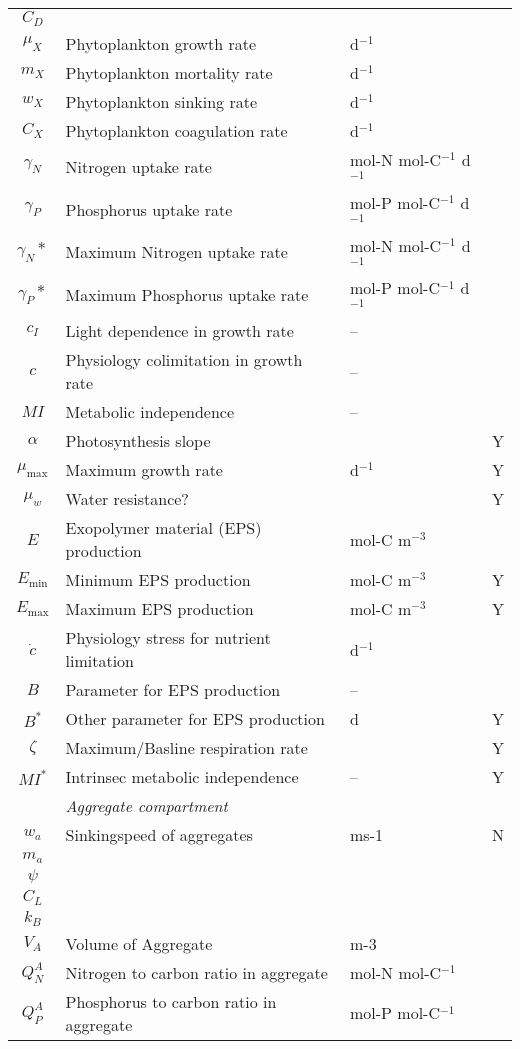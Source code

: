 \documentclass[fleqn]{article}                     %
\begin{document}
\begin{table*}[h]
\begin{tabular}{clll}
    $C_D$&\\
    $\mu_X$ & Phytoplankton growth rate & d$^{-1}$ \\
    $m_X$ & Phytoplankton mortality rate & d$^{-1}$ \\
    $w_X$ & Phytoplankton sinking rate & d$^{-1}$ \\
    $C_X$ & Phytoplankton coagulation rate & d$^{-1}$ \\
    $\gamma_N$ & Nitrogen uptake rate & mol-N mol-C$^{-1}$ d$^{-1}$ \\
    $\gamma_P$ & Phosphorus uptake rate & mol-P mol-C$^{-1}$ d$^{-1}$ \\
    $\gamma_N*$ & Maximum Nitrogen uptake rate & mol-N mol-C$^{-1}$ d$^{-1}$ \\
    $\gamma_P*$ & Maximum Phosphorus uptake rate & mol-P mol-C$^{-1}$ d$^{-1}$ \\
    $c_I$ & Light dependence in growth rate & -- \\
    $c$ & Physiology colimitation in growth rate & -- \\
    $MI$ & Metabolic independence & -- \\
    $\alpha$ & Photosynthesis slope & &Y \\
    $\mu_{\textrm{max}}$ & Maximum growth rate & d$^{-1}$ &Y\\
    $\mu_w$&Water resistance?&&Y\\
    $E$ & Exopolymer material (EPS) production & mol-C m$^{-3}$ \\
    $E_{\textrm{min}}$ & Minimum EPS production & mol-C m$^{-3}$&Y \\
    $E_{\textrm{max}}$ & Maximum EPS production & mol-C m$^{-3}$ &Y\\
    $\dot{c}$ & Physiology stress for nutrient limitation & d$^{-1}$ \\
    $B$ & Parameter for EPS production & -- \\
    $B^*$ & Other parameter for EPS production & d &Y\\
    $\zeta$ & Maximum/Basline respiration rate &&Y\\
    $MI^*$ & Intrinsec metabolic independence & --&Y \\ \hline
    & \emph{Aggregate compartment} & \\
    $w_a$&Sinkingspeed of aggregates&ms-1&N\\
    $m_a$\\
    $\psi$ &&\\
    $C_L$ &&\\
    $k_B$&&\\
    $V_A$ & Volume of Aggregate & m-3 \\
    $Q^A_N$ & Nitrogen to carbon ratio in aggregate & mol-N mol-C$^{-1}$ \\
    $Q^A_P$ & Phosphorus to carbon ratio in aggregate & mol-P mol-C$^{-1}$ \\
    \hline
  \end{tabular}
\end{table*}
\end{document}
